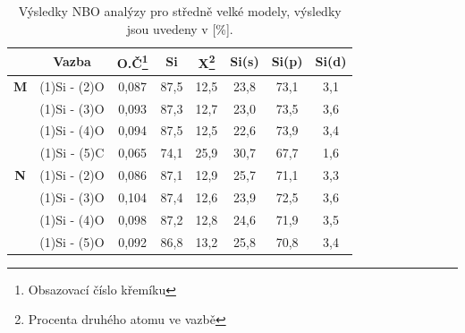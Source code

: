\documentclass[
digital, %
table,   %
lof,     %
lot,     %
oneside,
]{fithesis3}
\begin{document}
\begin{table}[htbp]
\begin{minipage}{\textwidth}
\caption{Výsledky NBO analýzy pro středně velké modely, výsledky jsou uvedeny v [\%].}
\begin{tabular}{|c|c|c|c|c|c|c|c|}
\hline
\label{nbo_middle} &  Vazba & O.Č\footnote{Obsazovací číslo křemíku} & Si & X\footnote{Procenta druhého atomu ve  vazbě} & Si(s) & Si(p) &Si(d) \\ \hline
\textbf{M} & (1)Si - (2)O & 0,087 & 87,5  & 12,5  & 23,8  & 73,1  & 3,1  \\ \hline
& (1)Si - (3)O & 0,093 & 87,3  & 12,7  & 23,0  & 73,5  & 3,6  \\ \hline
&(1)Si - (4)O & 0,094 & 87,5  & 12,5  & 22,6  & 73,9  & 3,4  \\ \hline
& (1)Si - (5)C & 0,065 & 74,1  & 25,9  & 30,7  & 67,7  & 1,6  \\ \hline
\textbf{N} & (1)Si - (2)O & 0,086 & 87,1  & 12,9  & 25,7  & 71,1  & 3,3  \\ \hline
& (1)Si - (3)O & 0,104 & 87,4  & 12,6  & 23,9  & 72,5  & 3,6  \\ \hline
& (1)Si - (4)O & 0,098 & 87,2  & 12,8  & 24,6  & 71,9  & 3,5  \\ \hline
& (1)Si - (5)O & 0,092 & 86,8  & 13,2  & 25,8  & 70,8  & 3,4  \\ \hline
\end{tabular}
\end{minipage}
\end{table}
\end{document}
